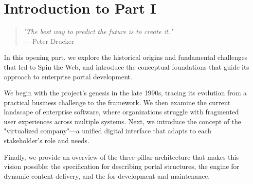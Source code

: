 
\chapter*{Introduction to Part I}
\label{part:foundations}

\begin{quote}
\textit{"The best way to predict the future is to create it."} \\
— Peter Drucker
\end{quote}

In this opening part, we explore the historical origins and fundamental challenges that led to Spin the Web, and introduce the conceptual foundations that guide its approach to enterprise portal development.

We begin with the project's genesis in the late 1990s, tracing its evolution from a practical business challenge to the framework. We then examine the current landscape of enterprise software, where organizations struggle with fragmented user experiences across multiple systems. Next, we introduce the concept of the "virtualized company"—a unified digital interface that adapts to each stakeholder's role and needs.

Finally, we provide an overview of the three-pillar architecture that makes this vision possible: the \wbdl{} specification for describing portal structures, the \webspinner{} engine for dynamic content delivery, and the \studio{} for development and maintenance.

